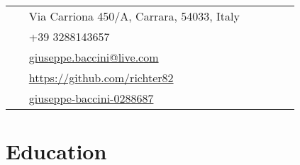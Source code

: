 \documentclass[10pt]{article} %
\begin{document}
\begin{paracol}{2}

\vspace{-\baselineskip}\medskip %

\switchcolumn %


\parbox[top][0.12\textheight][c]{\linewidth}{ %
	\vspace{-0.04\textheight} %
	\colorbox{shade}{ %
		\begin{supertabular}{p{0.05\linewidth}|p{0.775\linewidth}} %
			\raisebox{-1pt}{\faHome} & Via Carriona 450/A, Carrara, 54033, Italy \\ %
			\raisebox{-1pt}{\faPhone} & +39 3288143657 \\ %
			\raisebox{0pt}{\small\faEnvelope} & \href{mailto:giuseppe.baccini@live.com}{giuseppe.baccini@live.com} \\ %
			\raisebox{-1pt}{\faGithub} & \href{https://github.com/richter82}{https://github.com/richter82} \\ %
			\raisebox{-1pt}{\faLinkedinSquare} & \href{https://www.linkedin.com/in/giuseppe-baccini-0288687}{giuseppe-baccini-0288687} \\ %
		\end{supertabular}
	}
}


\section{Education} 



\end{paracol}
\end{document}
